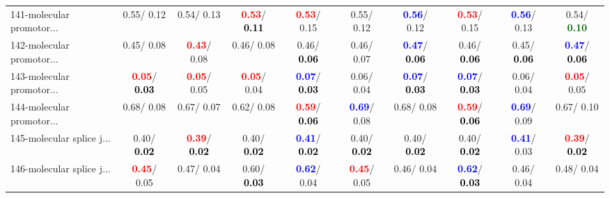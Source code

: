 \begin{table}[h]
\begin{center}
{\begin{tabular}{lc|c|c|c|c|c|c|c|c}
141-molecular promotor... &   0.55/  0.12 &   0.54/  0.13 & \textcolor{red}{\textbf{  0.53}}/\textcolor{black}{\textbf{  0.11}} & \textcolor{red}{\textbf{  0.53}}/  0.15 &   0.55/  0.12 & \textcolor{blue}{\textbf{  0.56}}/  0.12 & \textcolor{red}{\textbf{  0.53}}/  0.15 & \textcolor{blue}{\textbf{  0.56}}/  0.13 &   0.54/\textcolor{darkgreen}{\textbf{  0.10}} \\
142-molecular promotor... &   0.45/  0.08 & \textcolor{red}{\textbf{  0.43}}/  0.08 &   0.46/  0.08 &   0.46/\textcolor{black}{\textbf{  0.06}} &   0.46/  0.07 & \textcolor{blue}{\textbf{  0.47}}/\textcolor{black}{\textbf{  0.06}} &   0.46/\textcolor{black}{\textbf{  0.06}} &   0.45/\textcolor{black}{\textbf{  0.06}} & \textcolor{blue}{\textbf{  0.47}}/\textcolor{black}{\textbf{  0.06}} \\ \hline
143-molecular promotor... & \textcolor{red}{\textbf{  0.05}}/\textcolor{black}{\textbf{  0.03}} & \textcolor{red}{\textbf{  0.05}}/  0.05 & \textcolor{red}{\textbf{  0.05}}/  0.04 & \textcolor{blue}{\textbf{  0.07}}/\textcolor{black}{\textbf{  0.03}} &   0.06/  0.04 & \textcolor{blue}{\textbf{  0.07}}/\textcolor{black}{\textbf{  0.03}} & \textcolor{blue}{\textbf{  0.07}}/\textcolor{black}{\textbf{  0.03}} &   0.06/  0.04 & \textcolor{red}{\textbf{  0.05}}/  0.05 \\
144-molecular promotor... &   0.68/  0.08 &   0.67/  0.07 &   0.62/  0.08 & \textcolor{red}{\textbf{  0.59}}/\textcolor{black}{\textbf{  0.06}} & \textcolor{blue}{\textbf{  0.69}}/  0.08 &   0.68/  0.08 & \textcolor{red}{\textbf{  0.59}}/\textcolor{black}{\textbf{  0.06}} & \textcolor{blue}{\textbf{  0.69}}/  0.09 &   0.67/  0.10 \\
145-molecular splice j... &   0.40/\textcolor{black}{\textbf{  0.02}} & \textcolor{red}{\textbf{  0.39}}/\textcolor{black}{\textbf{  0.02}} &   0.40/\textcolor{black}{\textbf{  0.02}} & \textcolor{blue}{\textbf{  0.41}}/\textcolor{black}{\textbf{  0.02}} &   0.40/\textcolor{black}{\textbf{  0.02}} &   0.40/\textcolor{black}{\textbf{  0.02}} &   0.40/\textcolor{black}{\textbf{  0.02}} & \textcolor{blue}{\textbf{  0.41}}/  0.03 & \textcolor{red}{\textbf{  0.39}}/\textcolor{black}{\textbf{  0.02}} \\
146-molecular splice j... & \textcolor{red}{\textbf{  0.45}}/  0.05 &   0.47/  0.04 &   0.60/\textcolor{black}{\textbf{  0.03}} & \textcolor{blue}{\textbf{  0.62}}/  0.04 & \textcolor{red}{\textbf{  0.45}}/  0.05 &   0.46/  0.04 & \textcolor{blue}{\textbf{  0.62}}/\textcolor{black}{\textbf{  0.03}} &   0.46/  0.04 &   0.48/  0.04 \\

\end{tabular}}
\end{center}
\end{table}
